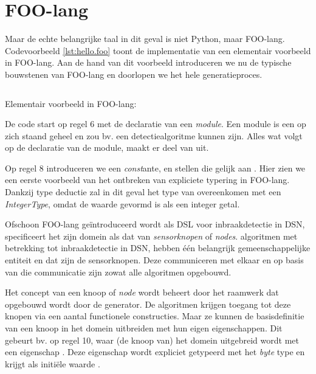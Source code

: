 
\section{FOO-lang}
\label{section:devel-foo-lang}

Maar de echte belangrijke taal in dit geval is niet Python, maar FOO-lang.
Codevoorbeeld \ref{lst:hello.foo} toont de implementatie van een elementair voorbeeld
in FOO-lang. Aan de hand van dit voorbeeld introduceren we nu de typische
bouwstenen van FOO-lang en doorlopen we het hele generatieproces.

\begin{listing}[ht]
  \inputminted[linenos,frame=lines,framesep=2mm,fontsize=\footnotesize]{js}{../src/foo-lang/examples/hello.foo}
  \vspace{-3mm}
  \caption{Elementair voorbeeld in FOO-lang: }
  \label{lst:hello.foo}
\end{listing}

De code start op regel 6 met de declaratie van een \emph{module}. Een module is
een op zich staand geheel en zou bv. een detectiealgoritme kunnen zijn. Alles
wat volgt op de declaratie van de module, maakt er deel van uit.

Op regel 8 introduceren we een \emph{const}ante,  en stellen die
gelijk aan . Hier zien we een eerste voorbeeld van het ontbreken van
expliciete typering in FOO-lang. Dankzij type deductie zal in dit geval het
type van  overeenkomen met een \emph{IntegerType}, omdat de
waarde  gevormd is als een integer getal.

Ofschoon FOO-lang ge\"introduceerd wordt als DSL voor inbraakdetectie in DSN,
specificeert het zijn domein als dat van \emph{sensorknopen} of \emph{nodes}.
algoritmen met betrekking tot inbraakdetectie in DSN, hebben \'e\'en belangrijk
gemeenschappelijke entiteit en dat zijn de sensorknopen. Deze communiceren met
elkaar en op basis van die communicatie zijn zowat alle algoritmen opgebouwd.

Het concept van een knoop of \emph{node} wordt beheert door het raamwerk dat
opgebouwd wordt door de generator. De algoritmen krijgen toegang tot deze
knopen via een aantal functionele constructies. Maar ze kunnen de
basisdefinitie van een knoop in het domein uitbreiden met hun eigen
eigenschappen. Dit gebeurt bv. op regel 10, waar (de knoop van) het domein
uitgebreid wordt met een eigenschap . Deze eigenschap wordt
expliciet getypeerd met het \emph{byte} type en krijgt als initi\"ele waarde
.

